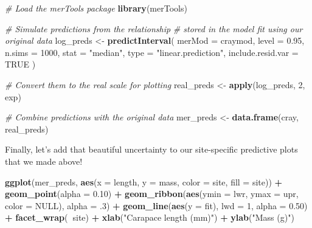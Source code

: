 \documentclass[
]{book}
\newenvironment{Shaded}{\begin{snugshade}}{\end{snugshade}}
\newcommand{\CommentTok}[1]{\textcolor[rgb]{0.56,0.35,0.01}{\textit{#1}}}
\newcommand{\DataTypeTok}[1]{\textcolor[rgb]{0.13,0.29,0.53}{#1}}
\newcommand{\DecValTok}[1]{\textcolor[rgb]{0.00,0.00,0.81}{#1}}
\newcommand{\FloatTok}[1]{\textcolor[rgb]{0.00,0.00,0.81}{#1}}
\newcommand{\KeywordTok}[1]{\textcolor[rgb]{0.13,0.29,0.53}{\textbf{#1}}}
\newcommand{\NormalTok}[1]{#1}
\newcommand{\OperatorTok}[1]{\textcolor[rgb]{0.81,0.36,0.00}{\textbf{#1}}}
\newcommand{\OtherTok}[1]{\textcolor[rgb]{0.56,0.35,0.01}{#1}}
\newcommand{\StringTok}[1]{\textcolor[rgb]{0.31,0.60,0.02}{#1}}
\begin{document}
\begin{Shaded}
\begin{Highlighting}[]
\CommentTok{# Load the merTools package}
\KeywordTok{library}\NormalTok{(merTools)}

\CommentTok{# Simulate predictions from the relationship}
\CommentTok{# stored in the model fit using our original data}
\NormalTok{log_preds <-}\StringTok{ }\KeywordTok{predictInterval}\NormalTok{(}
  \DataTypeTok{merMod =}\NormalTok{ craymod,}
  \DataTypeTok{level =} \FloatTok{0.95}\NormalTok{, }\DataTypeTok{n.sims =} \DecValTok{1000}\NormalTok{,}
  \DataTypeTok{stat =} \StringTok{"median"}\NormalTok{, }\DataTypeTok{type =} \StringTok{"linear.prediction"}\NormalTok{,}
  \DataTypeTok{include.resid.var =} \OtherTok{TRUE}
\NormalTok{)}

\CommentTok{# Convert them to the real scale for plotting}
\NormalTok{real_preds <-}\StringTok{ }\KeywordTok{apply}\NormalTok{(log_preds, }\DecValTok{2}\NormalTok{, exp)}

\CommentTok{# Combine predictions with the original data}
\NormalTok{mer_preds <-}\StringTok{ }\KeywordTok{data.frame}\NormalTok{(cray, real_preds)}
\end{Highlighting}
\end{Shaded}

Finally, let's add that beautiful uncertainty to our site-specific predictive plots that we made above!

\begin{Shaded}
\begin{Highlighting}[]
\KeywordTok{ggplot}\NormalTok{(mer_preds, }\KeywordTok{aes}\NormalTok{(}\DataTypeTok{x =}\NormalTok{ length, }\DataTypeTok{y =}\NormalTok{ mass, }\DataTypeTok{color =}\NormalTok{ site, }\DataTypeTok{fill =}\NormalTok{ site)) }\OperatorTok{+}
\StringTok{  }\KeywordTok{geom_point}\NormalTok{(}\DataTypeTok{alpha =} \FloatTok{0.10}\NormalTok{) }\OperatorTok{+}
\StringTok{  }\KeywordTok{geom_ribbon}\NormalTok{(}\KeywordTok{aes}\NormalTok{(}\DataTypeTok{ymin =}\NormalTok{ lwr, }\DataTypeTok{ymax =}\NormalTok{ upr, }\DataTypeTok{color =} \OtherTok{NULL}\NormalTok{), }\DataTypeTok{alpha =} \FloatTok{.3}\NormalTok{) }\OperatorTok{+}
\StringTok{  }\KeywordTok{geom_line}\NormalTok{(}\KeywordTok{aes}\NormalTok{(}\DataTypeTok{y =}\NormalTok{ fit), }\DataTypeTok{lwd =} \DecValTok{1}\NormalTok{, }\DataTypeTok{alpha =} \FloatTok{0.50}\NormalTok{) }\OperatorTok{+}
\StringTok{  }\KeywordTok{facet_wrap}\NormalTok{(}\OperatorTok{~}\NormalTok{site) }\OperatorTok{+}
\StringTok{  }\KeywordTok{xlab}\NormalTok{(}\StringTok{"Carapace length (mm)"}\NormalTok{) }\OperatorTok{+}
\StringTok{  }\KeywordTok{ylab}\NormalTok{(}\StringTok{"Mass (g)"}\NormalTok{)}
\end{Highlighting}
\end{Shaded}
\end{document}
